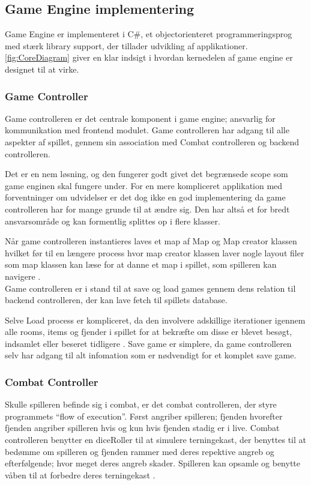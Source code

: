 \subsection{Game Engine implementering}
Game Engine er implementeret i C\#, et objectorienteret programmeringsprog
med stærk library support, der tillader udvikling af applikationer. 
\autoref{fig:CoreDiagram} giver en klar indsigt i hvordan kernedelen af
game engine er designet til at virke. 

\subsubsection{Game Controller}
Game controlleren er det centrale komponent i game engine; ansvarlig for 
kommunikation med frontend modulet. Game controlleren har adgang til alle
aspekter af spillet, gennem sin association med Combat controlleren og 
backend controlleren.

\noindent Det er en nem løsning, og den fungerer godt givet det begrænsede scope som 
game enginen skal fungere under.
For en mere kompliceret applikation med forventninger om udvidelser er det
dog ikke en god implementering da game controlleren har for mange grunde
til at ændre sig. Den har altså et for bredt ansvarsområde og kan formentlig
splittes op i flere klasser.

\noindent Når game controlleren instantieres laves et map af Map og Map creator klassen
hvilket før til en længere process hvor map creator klassen laver nogle
layout filer som map klassen kan læse for at danne et map i spillet, som 
spilleren kan navigere \parencite[Section 11.3.2][]{TekniskBilag}.\\

\noindent Game controlleren er i stand til at save og load games gennem 
dens relation til backend controlleren, der kan lave fetch til spillets
database.

\noindent Selve Load process er kompliceret, da den involvere adskillige iterationer
igennem alle rooms, items og fjender i spillet for at bekræfte om disse er
blevet besøgt, indsamlet eller beseret tidligere \parencite[Section 11.3.1]
[Figure 55]{TekniskBilag}.
Save game er simplere, da game controlleren selv har adgang til alt infomation
som er nødvendigt for et komplet save game.

\subsubsection{Combat Controller}
Skulle spilleren befinde sig i combat, er det combat controlleren, der styre programmets
``flow of execution''. Først angriber spilleren; fjenden hvorefter fjenden angriber spilleren
hvis og kun hvis fjenden stadig er i live. Combat controlleren benytter en diceRoller til
at simulere terningekast, der benyttes til at bedømme om spilleren og fjenden rammer med
deres repektive angreb og efterfølgende; hvor meget deres angreb skader. Spilleren kan opsamle
og benytte våben til at forbedre deres terningekast \parencite[Section 10.3.2][]{TekniskBilag}. 

